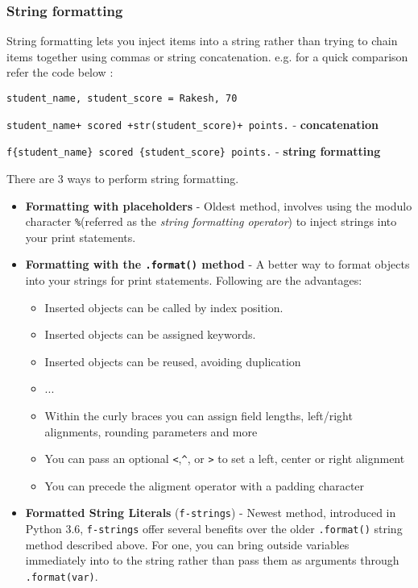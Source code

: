 \documentclass[11pt]{article}
\providecommand{\tightlist}{%
      \setlength{\itemsep}{0pt}\setlength{\parskip}{0pt}}
\begin{document}
    \subsubsection{String formatting}\label{string-formatting}

String formatting lets you inject items into a string rather than trying
to chain items together using commas or string concatenation. e.g. for a
quick comparison refer the code below :

\texttt{student\_name,\ student\_score\ =\ \textquotesingle{}Rakesh\textquotesingle{},\ 70}

\texttt{student\_name+\textquotesingle{}\ scored\ \textquotesingle{}+str(student\_score)+\textquotesingle{}\ points.\textquotesingle{}}
- \textbf{concatenation}

\texttt{f\textquotesingle{}\{student\_name\}\ scored\ \{student\_score\}\ points.\textquotesingle{}}
- \textbf{string formatting}

There are 3 ways to perform string formatting.

\begin{itemize}
\item
  \textbf{Formatting with placeholders} - Oldest method, involves using
  the modulo character \texttt{\%}(referred as the \emph{string
  formatting operator}) to inject strings into your print statements.
\item
  \textbf{Formatting with the \texttt{.format()} method} - A better way
  to format objects into your strings for print statements. Following
  are the advantages:

  \begin{itemize}
  \tightlist
  \item
    Inserted objects can be called by index position.
  \item
    Inserted objects can be assigned keywords.
  \item
    Inserted objects can be reused, avoiding duplication
  \item
    ...
  \item
    Within the curly braces you can assign field lengths, left/right
    alignments, rounding parameters and more
  \item
    You can pass an optional \texttt{\textless{}},\texttt{\^{}}, or
    \texttt{\textgreater{}} to set a left, center or right alignment
  \item
    You can precede the aligment operator with a padding character
  \end{itemize}
\item
  \textbf{Formatted String Literals} (\texttt{f-strings}) - Newest
  method, introduced in Python 3.6, \texttt{f-strings} offer several
  benefits over the older \texttt{.format()} string method described
  above. For one, you can bring outside variables immediately into to
  the string rather than pass them as arguments through
  \texttt{.format(var)}.
\end{itemize}
\end{document}
